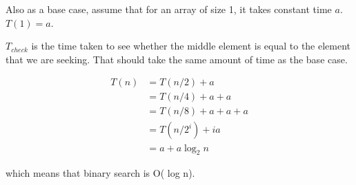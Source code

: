 \documentclass[12pt]{article}
\begin{document}
Also as a base case, assume that for an array of size 1, it takes constant time $a$. $T(1) = a$.

$T_{check}$ is the time taken to see whether the middle element is equal to the element that we are seeking. That should take the same amount of time as the base case. 

\begin{align*}
T(n) &= T(n/2) + a \\
&= T(n/4) + a + a \\
&= T(n/8) + a + a + a \\
&= T(n/2^i) + ia\\
&= a + a \log_2 n 
\end{align*}


which means that binary search is O( log n).
\end{document}
